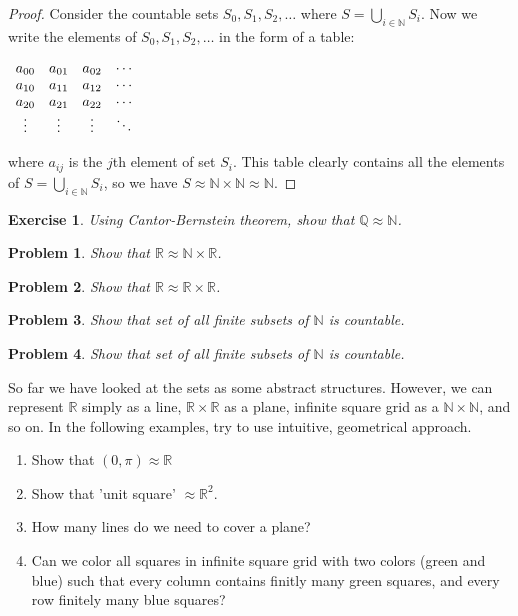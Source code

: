 \documentclass[11pt,a5paper]{article}
\newtheorem{exercise}{Exercise}
\newtheorem{problem}{Problem}
\begin{document}
\begin{proof} 
Consider the countable sets $S_0, S_1, S_2, \ldots$ where $\displaystyle S = \bigcup_{i \mathop \in \mathbb{N}} {S_i}$. Now we write the elements of $S_0, S_1, S_2, \ldots$ in the form of a table:

$\begin{array} {*{4}c} {a_{00}} & {a_{01}} & {a_{02}} & \cdots \\ {a_{10}} & {a_{11}} & {a_{12}} & \cdots \\ {a_{20}} & {a_{21}} & {a_{22}} & \cdots \\ \vdots & \vdots & \vdots & \ddots \\ \end{array}$

\noindent where $a_{ij}$ is the $j$th element of set $S_i$. This table clearly contains all the elements of $\displaystyle S = \bigcup_{i \mathop \in \mathbb{N}} {S_i}$, so we have $S \approx \mathbb{N}\times\mathbb{N} \approx \mathbb{N}$.
\end{proof}

\begin{exercise} Using Cantor-Bernstein theorem, show that $\mathbb{Q}\approx\mathbb{N}$. 
\end{exercise}

\begin{problem} 
Show that $\mathbb{R} \approx \mathbb{N} \times \mathbb{R}$.
\end{problem}

\begin{problem} 
Show that $\mathbb{R} \approx \mathbb{R} \times \mathbb{R}$.
\end{problem}

\begin{problem} 
Show that set of all finite subsets of $\mathbb{N}$ is countable.
\end{problem}

\begin{problem} 
Show that set of all finite subsets of $\mathbb{N}$ is countable.
\end{problem}

\noindent So far we have looked at the sets as some abstract structures. However, we can represent $\mathbb{R}$ simply as a line, $\mathbb{R}\times\mathbb{R}$ as a plane, infinite square grid as a $\mathbb{N}\times\mathbb{N}$, and so on. In the following examples, try to use intuitive, geometrical approach.

\begin{enumerate}
  \item Show that $(0,\pi)\approx\mathbb{R}$
  \item Show that 'unit square' $\approx\mathbb{R}^2$.
  \item How many lines do we need to cover a plane?
  \item Can we color all squares in infinite square grid with two colors (green and blue) such that every column contains finitly many green squares, and every row finitely many blue squares?
\end{enumerate}
\end{document}
